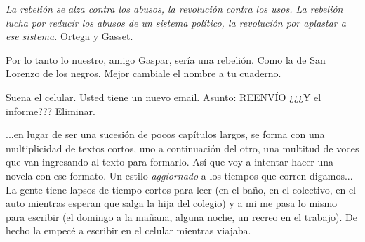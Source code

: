 \documentclass[12pt,twoside,openright,a5paper]{book}
\begin{document}
\vspace{0.5cm}

\hrulefill\hspace{0.2cm} \decofourleft\decofourright \hspace{0.2cm} \hrulefill
\vspace{0.5cm}

\emph{
La rebelión se alza contra los abusos, la revolución contra los
usos. La rebelión lucha por reducir los abusos de un sistema político,
la revolución por aplastar a ese sistema.} Ortega y Gasset.

Por lo tanto lo nuestro, amigo Gaspar, sería una rebelión. Como la de
San Lorenzo de los negros. Mejor cambiale el nombre a tu cuaderno.


\vspace{0.5cm}

\hrulefill\hspace{0.2cm} \decofourleft\decofourright \hspace{0.2cm} \hrulefill
\vspace{0.5cm}

Suena el celular. Usted tiene un nuevo email. Asunto: \linebreak
REENVÍO ¿¿¿Y el informe??? Eliminar.


\vspace{0.5cm}

\hrulefill\hspace{0.2cm} \decofourleft\decofourright \hspace{0.2cm} \hrulefill
\vspace{0.5cm}

...en lugar de ser una sucesión de pocos capítulos largos, se forma con una
multiplicidad de textos cortos, uno a continuación del otro, una multitud
de voces que van ingresando al texto para formarlo. Así que voy a intentar
hacer una novela con ese formato. Un estilo \emph{aggiornado} a los tiempos que
corren digamos... La gente tiene lapsos de tiempo cortos para leer (en el
baño, en el colectivo, en el auto mientras esperan que salga la hija del
colegio) y a mi me pasa lo mismo para escribir (el domingo a la mañana,
alguna noche, un recreo en el trabajo). De hecho la empecé a escribir en
el celular mientras viajaba.
\end{document}
